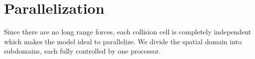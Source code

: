 \section{Parallelization}
Since there are no long range forces, each collision cell is completely independent which makes the model ideal to parallelize. We divide the spatial domain into subdomains, each fully controlled by one processor. 
\subsection{}